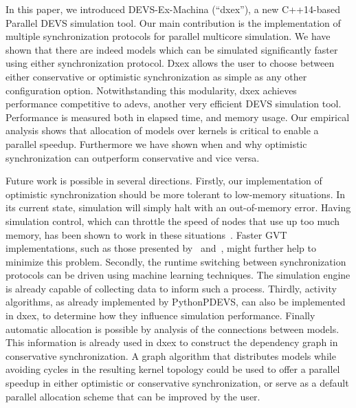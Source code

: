 In this paper, we introduced DEVS-Ex-Machina (``dxex''), a new C++14-based \textsf{Parallel DEVS} simulation tool.
Our main contribution is the implementation of multiple synchronization protocols for parallel multicore simulation.
We have shown that there are indeed models which can be simulated significantly faster using either synchronization protocol.
Dxex allows the user to choose between either conservative or optimistic synchronization as simple as any other configuration option.
Notwithstanding this modularity, dxex achieves performance competitive to adevs, another very efficient \textsf{DEVS} simulation tool.
Performance is measured both in elapsed time, and memory usage.
Our empirical analysis shows that allocation of models over kernels is critical to enable a parallel speedup. Furthermore we have shown when and why optimistic synchronization can outperform conservative and vice versa.

Future work is possible in several directions.
Firstly, our implementation of optimistic synchronization should be more tolerant to low-memory situations.
In its current state, simulation will simply halt with an out-of-memory error.
Having simulation control, which can throttle the speed of nodes that use up too much memory, has been shown to work in these situations~\cite{FujimotoBook}.
Faster GVT implementations, such as those presented by~\cite{Fujimoto:1997:CGV:268403.268404} and~\cite{Bauer:2005:SND:1069810.1070159}, might further help to minimize this problem.
Secondly, the runtime switching between synchronization protocols can be driven using machine learning techniques. The simulation engine is already capable of collecting data to inform such a process.
Thirdly, activity algorithms, as already implemented by PythonPDEVS, can also be implemented in dxex, to determine how they influence simulation performance.
Finally automatic allocation is possible by analysis of the connections between models. This information is already used in dxex to construct the dependency graph in conservative synchronization. A graph algorithm that distributes models while avoiding cycles in the resulting kernel topology could be used to offer a parallel speedup in either optimistic or conservative synchronization, or serve as a default parallel allocation scheme that can be improved by the user.